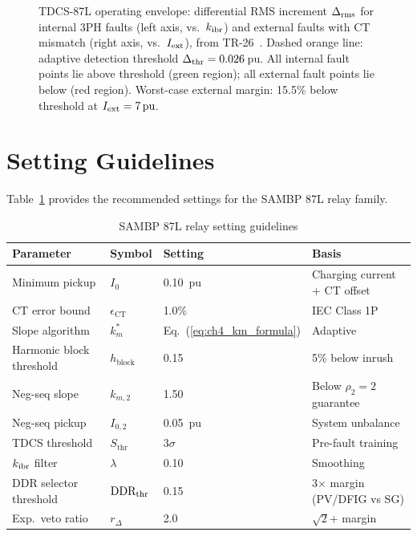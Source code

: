 \begin{figure}[htbp]
\caption{TDCS-87L operating envelope: differential RMS increment
         $\Delta_{\rm rms}$ for internal 3PH faults (left axis, vs.\
         $k_{\mathrm{ibr}}$) and external faults with CT mismatch (right axis, vs.\
         $I_{\rm ext}$), from TR-26~\cite{SAMBP_TR26}.
         Dashed orange line: adaptive detection threshold
         $\Delta_{\rm thr} = 0.026$\,pu.
         All internal fault points lie above threshold (green region);
         all external fault points lie below (red region).
         Worst-case external margin: 15.5\% below threshold at
         $I_{\rm ext} = 7\,\text{pu}$.}
\label{fig:ch4_tdcs_envelope}
\end{figure}

\section{Setting Guidelines}
\label{sec:ch4_settings}

Table~\ref{tab:ch4_settings} provides the recommended settings for the
SAMBP 87L relay family.

\begin{table}[htbp]
\caption{SAMBP 87L relay setting guidelines}
\label{tab:ch4_settings}
\begin{tabularx}{\textwidth}{@{}lXXl@{}}
\toprule
Parameter & Symbol & Setting & Basis \\
\midrule
Minimum pickup & $I_0$ & 0.10~pu & Charging current + CT offset \\
CT error bound & $\epsilon_\mathrm{CT}$ & 1.0\% & IEC Class 1P \\
Slope algorithm & $k_m^\ast$ & Eq.~(\ref{eq:ch4_km_formula}) & Adaptive \\
Harmonic block threshold & $h_\mathrm{block}$ & 0.15 & 5\% below inrush \\
Neg-seq slope & $k_{m,2}$ & 1.50 & Below $\rho_2 = 2$ guarantee \\
Neg-seq pickup & $I_{0,2}$ & 0.05~pu & System unbalance \\
TDCS threshold & $S_\mathrm{thr}$ & $3\sigma$ & Pre-fault training \\
$k_{\mathrm{ibr}}$ filter & $\lambda$ & 0.10 & Smoothing \\
DDR selector threshold & $\text{DDR}_{\rm thr}$ & 0.15 & 3$\times$ margin (PV/DFIG vs SG) \\
Exp.\ veto ratio & $r_\Delta$ & 2.0 & $\sqrt{2}$+ margin \\
\bottomrule
\end{tabularx}
\end{table}


